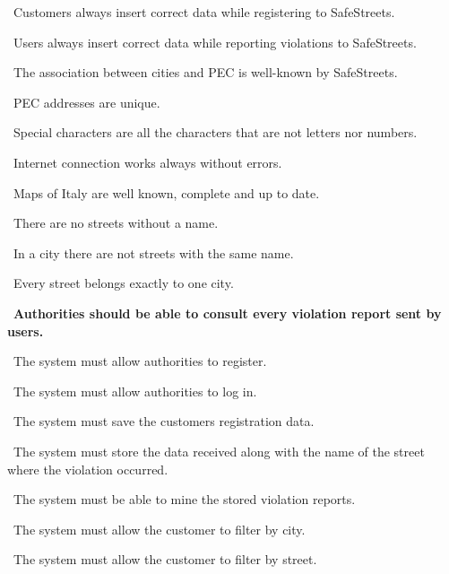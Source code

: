 \begin{description}
\begin{description}
\begin{description}
							\item {}\ Customers always insert correct data while registering to SafeStreets.
							\item {}\ Users always insert correct data while reporting violations to SafeStreets.
							\item {}\ The association between cities and PEC is well-known by SafeStreets.
							\item {}\ PEC addresses are unique.
							\item {}\ Special characters are all the characters that are not letters nor numbers.
							\item {}\ Internet connection works always without errors.
							\item {}\ Maps of Italy are well known, complete and up to date.
							\item {}\ There are no streets without a name.
							\item {}\ In a city there are not streets with the same name.
							\item {}\ Every street belongs exactly to one city.
						\end{description}
					\item {}\ \textbf{Authorities should be able to consult every violation report sent by users.}
						\begin{description}
							\item {}\ The system must allow authorities to register.
							\item {}\ The system must allow authorities to log in.
							\item {}\ The system must save the customers registration data.
							\item {}\ The system must store the data received along with the name of the street where the violation occurred.
							\item {}\ The system must be able to mine the stored violation reports.
							\item {}\ The system must allow the customer to filter by city.
							\item {}\ The system must allow the customer to filter by street.

\end{description}
\end{description}
\end{description}
